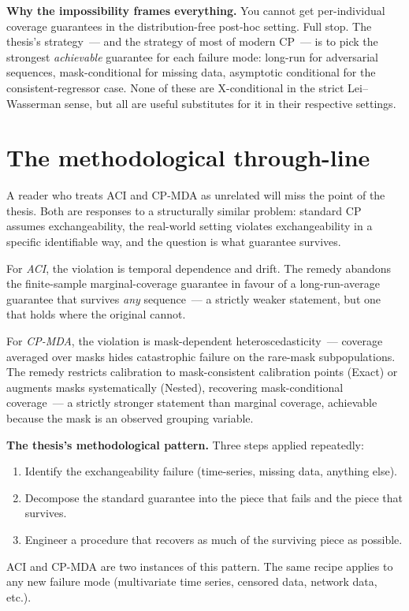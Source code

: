 \documentclass[letterpaper,11pt,leqno]{article}
\begin{document}
\begin{whymatters}
\textbf{Why the impossibility frames everything.} You cannot get per-individual coverage guarantees in the distribution-free post-hoc setting. Full stop. The thesis's strategy~--- and the strategy of most of modern CP~--- is to pick the strongest \emph{achievable} guarantee for each failure mode: long-run for adversarial sequences, mask-conditional for missing data, asymptotic conditional for the consistent-regressor case. None of these are X-conditional in the strict Lei--Wasserman sense, but all are useful substitutes for it in their respective settings.
\end{whymatters}

\section{The methodological through-line}\label{s:throughline}

A reader who treats ACI and CP-MDA as unrelated will miss the point of the thesis. Both are responses to a structurally similar problem: standard CP assumes exchangeability, the real-world setting violates exchangeability in a specific identifiable way, and the question is what guarantee survives.

For \emph{ACI}, the violation is temporal dependence and drift. The remedy abandons the finite-sample marginal-coverage guarantee in favour of a long-run-average guarantee that survives \emph{any} sequence~--- a strictly weaker statement, but one that holds where the original cannot.

For \emph{CP-MDA}, the violation is mask-dependent heteroscedasticity~--- coverage averaged over masks hides catastrophic failure on the rare-mask subpopulations. The remedy restricts calibration to mask-consistent calibration points (Exact) or augments masks systematically (Nested), recovering mask-conditional coverage~--- a strictly stronger statement than marginal coverage, achievable because the mask is an observed grouping variable.

\begin{keyinsight}
\textbf{The thesis's methodological pattern.} Three steps applied repeatedly:
\begin{enumerate}
\item Identify the exchangeability failure (time-series, missing data, anything else).
\item Decompose the standard guarantee into the piece that fails and the piece that survives.
\item Engineer a procedure that recovers as much of the surviving piece as possible.
\end{enumerate}
ACI and CP-MDA are two instances of this pattern. The same recipe applies to any new failure mode (multivariate time series, censored data, network data, etc.).
\end{keyinsight}
\end{document}
